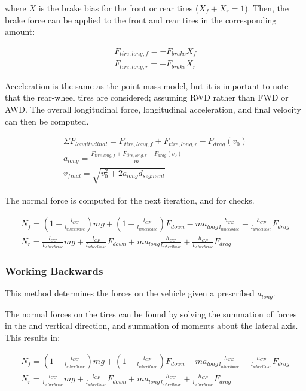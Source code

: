 \documentclass{article}
\begin{document}
where $X$ is the brake bias for the front or rear tires ($X_f + X_r = 1$). Then, the brake force can be applied to the front and rear tires in the corresponding amount:

\begin{align}
	F_{tire,long,f} = - F_{brake} X_{f} \\
	F_{tire,long,r} = - F_{brake} X_{r}
\end{align}

Acceleration is the same as the point-mass model, but it is important to note that the rear-wheel tires are considered; assuming RWD rather than FWD or AWD. The overall longitudinal force, longitudinal acceleration, and final velocity can then be computed.

\begin{align}
	\Sigma F_{longitudinal} = F_{tire,long,f} + F_{tire,long,r} - F_{drag}(v_0) \\
	a_{long} = \frac{ F_{tire,long,f} + F_{tire,long,r} - F_{drag}(v_0)}{m} \\
	v_{final} = \sqrt{v_0^2 + 2 a_{long} d_{segment}}
\end{align}

The normal force is computed for the next iteration, and for checks.

\begin{align}
	N_f = (1 - \frac{l_{CG}}{l_{wheelbase}}) m g 
			+ (1 - \frac{l_{CP}}{l_{wheelbase}}) F_{down}
			- m a_{long} \frac{h_{CG}}{l_{wheelbase}} 
			- \frac{h_{CP}}{l_{wheelbase}} F_{drag} \\
	N_r = \frac{l_{CG}}{l_{wheelbase}} m g 
			+ \frac{l_{CP}}{l_{wheelbase}} F_{down}
			+ m a_{long} \frac{h_{CG}}{l_{wheelbase}} 
			+ \frac{h_{CP}}{l_{wheelbase}} F_{drag}
\end{align}

\subsubsection{Working Backwards}
This method determines the forces on the vehicle given a prescribed $a_{long}$.

The normal forces on the tires can be found by solving the summation of forces in the and vertical direction, and summation of moments about the lateral axis. This results in:

\begin{align}
	N_f = (1 - \frac{l_{CG}}{l_{wheelbase}}) m g 
			+ (1 - \frac{l_{CP}}{l_{wheelbase}}) F_{down}
			- m a_{long} \frac{h_{CG}}{l_{wheelbase}} 
			- \frac{h_{CP}}{l_{wheelbase}} F_{drag} \\
	N_r = \frac{l_{CG}}{l_{wheelbase}} m g 
			+ \frac{l_{CP}}{l_{wheelbase}} F_{down}
			+ m a_{long} \frac{h_{CG}}{l_{wheelbase}} 
			+ \frac{h_{CP}}{l_{wheelbase}} F_{drag}
\end{align}
\end{document}
